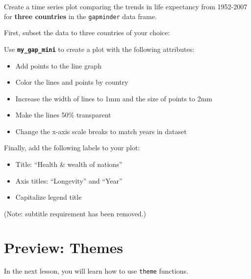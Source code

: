 \documentclass[
  letterpaper,
  DIV=11,
  numbers=noendperiod]{scrreprt}
\begin{document}
\begin{tcolorbox}[enhanced jigsaw, title=\textcolor{quarto-callout-tip-color}{\faLightbulb}\hspace{0.5em}{Practice}, colbacktitle=quarto-callout-tip-color!10!white, leftrule=.75mm, arc=.35mm, opacityback=0, bottomrule=.15mm, rightrule=.15mm, toptitle=1mm, breakable, toprule=.15mm, colback=white, coltitle=black, colframe=quarto-callout-tip-color-frame, bottomtitle=1mm, titlerule=0mm, left=2mm, opacitybacktitle=0.6]

Create a time series plot comparing the trends in life expectancy from
1952-2007 for \textbf{three countries} in the \texttt{gapminder} data
frame.

First, subset the data to three countries of your choice:

Use \textbf{\texttt{my\_gap\_mini}} to create a plot with the following
attributes:

\begin{itemize}
\item
  Add points to the line graph
\item
  Color the lines and points by country
\item
  Increase the width of lines to 1mm and the size of points to 2mm
\item
  Make the lines 50\% transparent
\item
  Change the x-axis scale breaks to match years in dataset
\end{itemize}

Finally, add the following labels to your plot:

\begin{itemize}
\item
  Title: ``Health \& wealth of nations''
\item
  Axis titles: ``Longevity'' and ``Year''
\item
  Capitalize legend title
\end{itemize}

(Note: subtitle requirement has been removed.)

\end{tcolorbox}

\section{Preview: Themes}\label{preview-themes}

In the next lesson, you will learn how to use \texttt{theme} functions.
\end{document}
